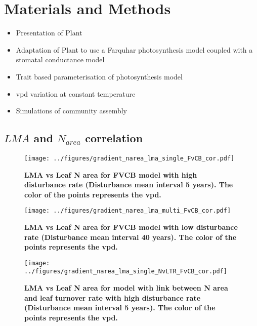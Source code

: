 \documentclass[a4paper,11pt]{article}
\begin{document}
\section{Materials and Methods}


\begin{itemize}

\item Presentation of Plant

\item Adaptation of Plant to use a Farquhar photosynthesis model coupled with a stomatal conductance model

\item Trait based parameterisation of photosynthesis model

\item vpd variation at constant temperature
  
\item Simulations of community assembly 

\end{itemize}



\clearpage

\subsection{$LMA$ and $N_{area}$ correlation}

\begin{figure}[ht]
\centering
\texttt{[image: ../figures/gradient\_narea\_lma\_single\_FvCB\_cor.pdf]}
\caption{\textbf{LMA vs Leaf N area for FVCB model with high disturbance rate (Disturbance mean interval 5 years). The color of the points represents the vpd.}
\label{fig:lma_narea_cor_single}}
\end{figure}


\begin{figure}[ht]
\centering
\texttt{[image: ../figures/gradient\_narea\_lma\_multi\_FvCB\_cor.pdf]}
\caption{\textbf{LMA vs Leaf N area for FVCB model with low disturbance rate (Disturbance mean interval 40 years). The color of the points represents the vpd.}
\label{fig:lma_narea_cor_multi}}
\end{figure}


\begin{figure}[ht]
\centering
\texttt{[image: ../figures/gradient\_narea\_lma\_single\_NvLTR\_FvCB\_cor.pdf]}
\caption{\textbf{LMA vs Leaf N area for model with link between N area and leaf turnover rate with high disturbance rate (Disturbance mean interval 5 years). The color of the points represents the vpd.}
\label{fig:lma_narea_cor_single_NvLTR}}
\end{figure}
\end{document}
